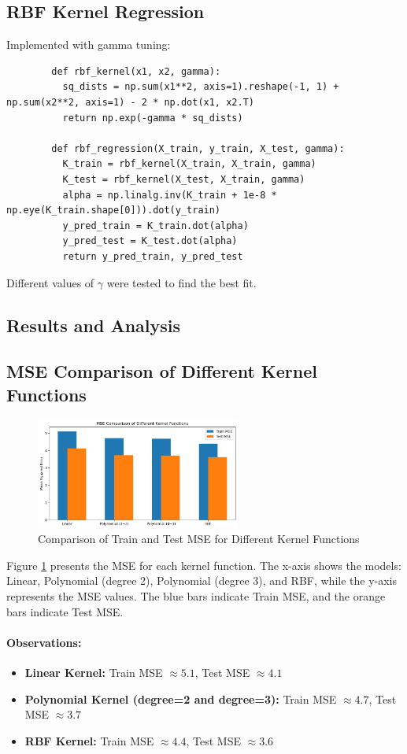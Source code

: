 \documentclass{article}
\begin{document}
	\subsection*{RBF Kernel Regression}
	Implemented with gamma tuning:
	\begin{verbatim}
		def rbf_kernel(x1, x2, gamma):
		  sq_dists = np.sum(x1**2, axis=1).reshape(-1, 1) + np.sum(x2**2, axis=1) - 2 * np.dot(x1, x2.T)
		  return np.exp(-gamma * sq_dists)
		
		def rbf_regression(X_train, y_train, X_test, gamma):
		  K_train = rbf_kernel(X_train, X_train, gamma)
		  K_test = rbf_kernel(X_test, X_train, gamma)
		  alpha = np.linalg.inv(K_train + 1e-8 * np.eye(K_train.shape[0])).dot(y_train)
		  y_pred_train = K_train.dot(alpha)
		  y_pred_test = K_test.dot(alpha)
		  return y_pred_train, y_pred_test
	\end{verbatim}
	Different values of $\gamma$ were tested to find the best fit.
	
	\subsection*{Results and Analysis}
	\subsection*{MSE Comparison of Different Kernel Functions}
	\begin{figure}[h!]
		\centering
		\includegraphics[width=0.6\textwidth]{images/q6_mse_compare.png}
		\caption{Comparison of Train and Test MSE for Different Kernel Functions}
		\label{fig:mse_comparison}
	\end{figure}
	
	Figure \ref{fig:mse_comparison} presents the MSE for each kernel function. The x-axis shows the models: Linear, Polynomial (degree 2), Polynomial (degree 3), and RBF, while the y-axis represents the MSE values. The blue bars indicate Train MSE, and the orange bars indicate Test MSE.
	
	\paragraph*{Observations:}
	\begin{itemize}
		\item \textbf{Linear Kernel:} Train MSE $\approx 5.1$, Test MSE $\approx 4.1$
		\item \textbf{Polynomial Kernel (degree=2 and degree=3):} Train MSE $\approx 4.7$, Test MSE $\approx 3.7$
		\item \textbf{RBF Kernel:} Train MSE $\approx 4.4$, Test MSE $\approx 3.6$
	\end{itemize}
	
\end{document}

